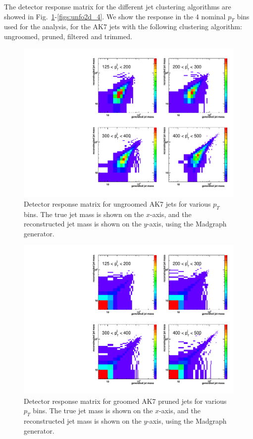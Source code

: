 The detector response matrix for the different jet clustering algorithms are showed in Fig.~\ref{figs:unfo2d_1}-\ref{figs:unfo2d_4}. We show the response in the 4 nominal $p_T$ bins used for the analysis, for the AK7 jets with the following clustering algorithm: ungroomed, pruned, filtered and trimmed.

\begin{figure}[!htb]
\centering
\includegraphics[width=1.0\textwidth]{figs/unf_response_ak7_pTbins.pdf}
\caption{Detector response matrix for ungroomed AK7 jets for various $p_T$ bins. The true jet 
mass is shown on the $x$-axis, and the reconstructed jet mass is shown on the $y$-axis, using the Madgraph generator.}
\label{figs:unfo2d_1}
\end{figure}

\begin{figure}[!htb]
\centering
\includegraphics[width=1.0\textwidth]{figs/unf_response_ak7pr_pTbins.pdf}
\caption{Detector response matrix for groomed AK7 pruned jets for various $p_T$ bins. The true jet 
mass is shown on the $x$-axis, and the reconstructed jet mass is shown on the $y$-axis, using the Madgraph generator.}
\label{figs:unfo2d_2}
\end{figure}

